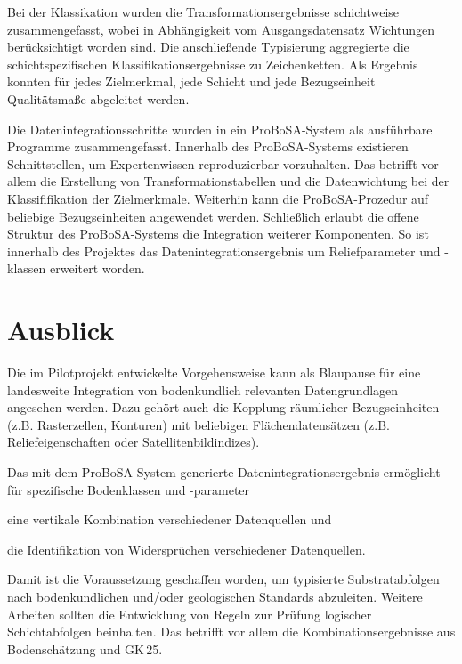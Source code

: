 Bei der Klassikation wurden die Transformationsergebnisse schichtweise zusammengefasst, wobei in Abhängigkeit vom Ausgangsdatensatz Wichtungen berücksichtigt worden sind. Die anschließende Typisierung aggregierte die schichtspezifischen Klassifikationsergebnisse zu Zeichenketten. Als Ergebnis konnten für jedes Zielmerkmal, jede Schicht und jede Bezugseinheit Qualitätsmaße abgeleitet werden.\

Die Datenintegrationsschritte wurden in ein ProBoSA-System als ausführbare Programme zusammengefasst. Innerhalb des ProBoSA-Systems existieren Schnittstellen, um Expertenwissen reproduzierbar vorzuhalten. Das betrifft vor allem die Erstellung von Transformationstabellen und die Datenwichtung bei der Klassififikation der Zielmerkmale. Weiterhin kann die ProBoSA-Prozedur auf beliebige Bezugseinheiten angewendet werden. Schließlich erlaubt die offene Struktur des ProBoSA-Systems die Integration weiterer Komponenten. So ist innerhalb des Projektes das Datenintegrationsergebnis um Reliefparameter und -klassen erweitert worden.
\newpage




\section{Ausblick}
Die im Pilotprojekt entwickelte Vorgehensweise kann als Blaupause für eine landesweite Integration von bodenkundlich relevanten Datengrundlagen angesehen werden. Dazu gehört auch die Kopplung räumlicher Bezugseinheiten (z.B. Rasterzellen, Konturen) mit beliebigen Flächendatensätzen (z.B. Reliefeigenschaften oder Satellitenbildindizes).\

Das mit dem ProBoSA-System generierte Datenintegrationsergebnis ermöglicht für spezifische Bodenklassen und -parameter 

\begin{compactitem}
	\item eine vertikale Kombination verschiedener Datenquellen und 
	\item die Identifikation von Widersprüchen verschiedener Datenquellen.
\end{compactitem}

Damit ist die Voraussetzung geschaffen worden, um typisierte Substratabfolgen nach bodenkundlichen und/oder geologischen Standards abzuleiten. Weitere Arbeiten sollten    die Entwicklung von Regeln zur  Prüfung logischer Schichtabfolgen beinhalten. Das betrifft vor allem die Kombinationsergebnisse aus Bodenschätzung und GK\,25.\ 

